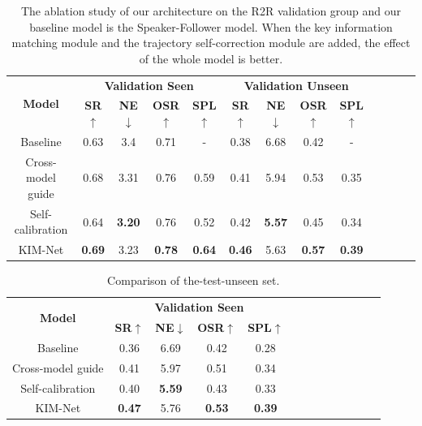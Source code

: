 \begin{table}[]
	\centering
	\caption{The ablation study of our architecture on the R2R validation group and our baseline model is the Speaker-Follower model. When the key information matching module and the trajectory self-correction module are added, the effect of the whole model is better.}
	{\begin{tabular}[c]{ccccccccccccc}
			\toprule[1pt]
			\multirow{2}{*}{{\textbf{Model}}} & \multicolumn{4}{c}{{\textbf{Validation Seen}}} & \multicolumn{4}{c}{{\textbf{Validation Unseen}}}\\
			
			& \textbf{SR}$\uparrow$ & \textbf{NE}$\downarrow$ & \textbf{OSR}$\uparrow$ & \textbf{SPL}$\uparrow$	& \textbf{SR}$\uparrow$ & \textbf{NE}$\downarrow$ & \textbf{OSR}$\uparrow$ & \textbf{SPL}$\uparrow$ & \\
			\toprule[1pt]
			
			Baseline   & 0.63 & 3.4 & 0.71 & - & 0.38 & 6.68 & 0.42 & -\\
			Cross-model guide  & 0.68 &  3.31 &  0.76 & 0.59 & 0.41 & 5.94 & 0.53  & 0.35 \\
			Self-calibration    & 0.64 & \textbf{3.20} & 0.76 & 0.52 & 0.42 & \textbf{5.57} & 0.45 & 0.34 \\
			KIM-Net & \textbf{0.69} &  3.23 & \textbf{0.78} & \textbf{0.64} & \textbf{0.46} & 5.63 & \textbf{0.57} & \textbf{0.39} \\

			\bottomrule[1pt]
		\end{tabular}
		\label{table_1}}
\end{table}

\begin{table}[]
	\centering
	\caption{Comparison of the-test-unseen set.}
	{\begin{tabular}[c]{ccccccccccccc}
			\toprule[1pt]
			\multirow{2}{*}{{\textbf{Model}}} & \multicolumn{4}{c}{{\textbf{Validation Seen}}} \\
			
			& \textbf{SR}$\uparrow$ & \textbf{NE}$\downarrow$ & \textbf{OSR}$\uparrow$ & \textbf{SPL}$\uparrow$	&  \\
			\toprule[1pt]
			
			Baseline   & 0.36 & 6.69 & 0.42 & 0.28 \\
			Cross-model guide  & 0.41 &  5.97 &  0.51 & 0.34  \\
			Self-calibration    & 0.40 & \textbf{5.59} & 0.43 & 0.33  \\
			KIM-Net & \textbf{0.47} &  5.76 & \textbf{0.53} & \textbf{0.39} \\
			
			\bottomrule[1pt]
		\end{tabular}
		\label{table_2}}
\end{table}

